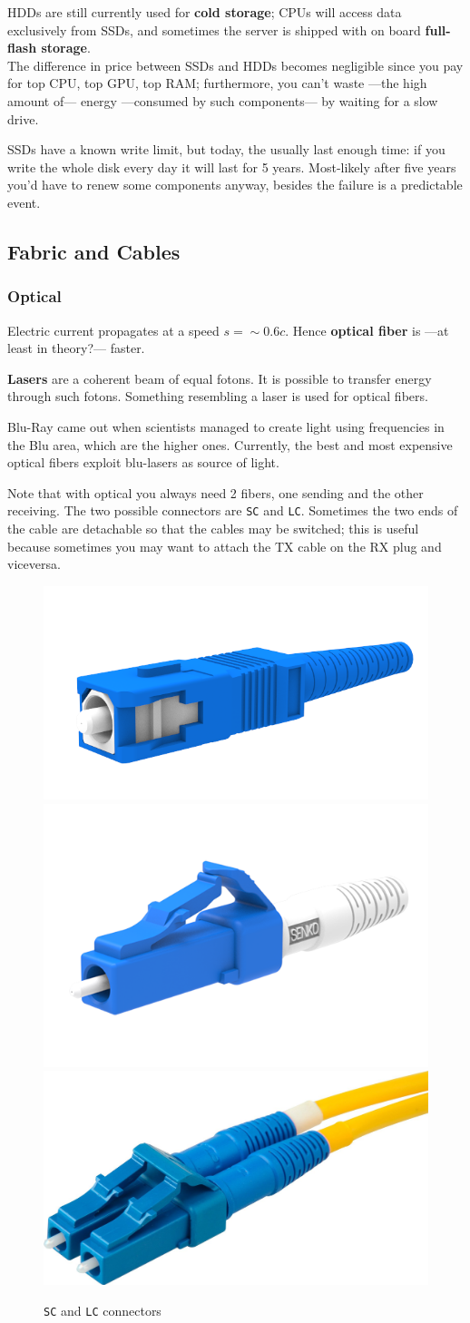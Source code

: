 HDDs are still currently used for \textbf{cold storage};
CPUs will access data exclusively from SSDs, and sometimes the server is shipped with on board \textbf{full-flash storage}.\\
The difference in price between SSDs and HDDs becomes negligible since you pay for top CPU, top GPU, top RAM;
furthermore, you can't waste ---the high amount of--- energy ---consumed by such components--- by waiting for a slow drive.

SSDs have a known write limit, but today, the usually last enough time: if you write the whole disk every day it will last for 5 years. Most-likely after five years you'd have to renew some components anyway, besides the failure is a predictable event.

\subsection{Fabric and Cables}
\subsubsection*{Optical}
Electric current propagates at a speed $s = {\sim}0.6c$.
Hence \textbf{optical fiber} is ---at least in theory?--- faster.

\textbf{Lasers} are a coherent beam of equal fotons. It is possible to transfer energy through such fotons. Something resembling a laser is used for optical fibers.

Blu-Ray came out when scientists managed to create light using frequencies in the Blu area, which are the higher ones.
Currently, the best and most expensive optical fibers exploit blu-lasers as source of light.

Note that with optical you always need 2 fibers, one sending and the other receiving. The two possible connectors are \texttt{SC} and \texttt{LC}.
Sometimes the two ends of the cable are detachable so that the cables may be switched; this is useful because sometimes you may want to attach the TX cable on the RX plug and viceversa. 

\begin{figure}[htbp]
   \centering
   \includegraphics[width=0.25\columnwidth]{images/SC.png}
   \includegraphics[width=0.25\columnwidth]{images/LC.png}
   \includegraphics[width=0.25\columnwidth]{images/LC_coupled.JPG}
   \caption{\texttt{SC} and \texttt{LC} connectors}
   \label{fig:sc_lc_connectors}
\end{figure}

